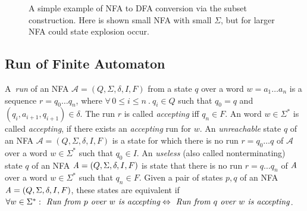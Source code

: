 \begin{figure}[t]
\begin{center}
\end{center}
	\caption{A simple example of NFA to DFA conversion via the subset construction. 
    Here is shown small NFA with small $\Sigma$, but for larger NFA could state explosion occur.}
    \label{pic_sub}
	\end{figure}



	\subsection{Run of Finite Automaton}
	\label{defRun}
  A~\emph{run} of an NFA $\mathcal{A}=(Q,\Sigma,\delta,I,F)$ from a state $q$
  over a word $w=a_1\ldots a_n$ is a sequence $r = q_0 \ldots q_n$, where $\forall\,0\leq i \leq n\ .\ q_i\in Q$ 
  such that $q_0=q$ and $(q_i,a_{i+1},q_{i+1})\in \delta$. 
  The run $r$ is called \emph{accepting} iff $q_n \in F$. 
	An word $w \in \Sigma^{*}$ is called \emph{accepting}, if there exists an \emph{accepting} run for $w$.
  An \emph{unreachable} state $q$ of an NFA $\mathcal{A}=(Q,\Sigma,\delta,I,F)$ is a state for which there is no run $r=q_0\ldots q$ of 
  $\mathcal{A}$ over a word $w \in \Sigma^{*}$ 
  such that $q_0\in I$.
  An \emph{useless} (also called nonterminating) state $q$ of an NFA $\emph{A}=(Q,\Sigma,\delta,I,F)$ is state that there is no run $r=q\ldots q_n$ 
  of $\emph{A}$ over a word
  $w \in \Sigma^{*}$ such that $q_n \in F$.
  Given a pair of states $p,q$ of an NFA $\emph{A}=(Q,\Sigma,\delta,I,F)$, these states are equivalent if 
  $\forall w \in \Sigma^{*}: \emph{ Run from } p \emph{ over } w \emph{ is accepting} \Leftrightarrow 
			\emph{ Run from } q \emph{ over } w \emph{ is accepting}$.


